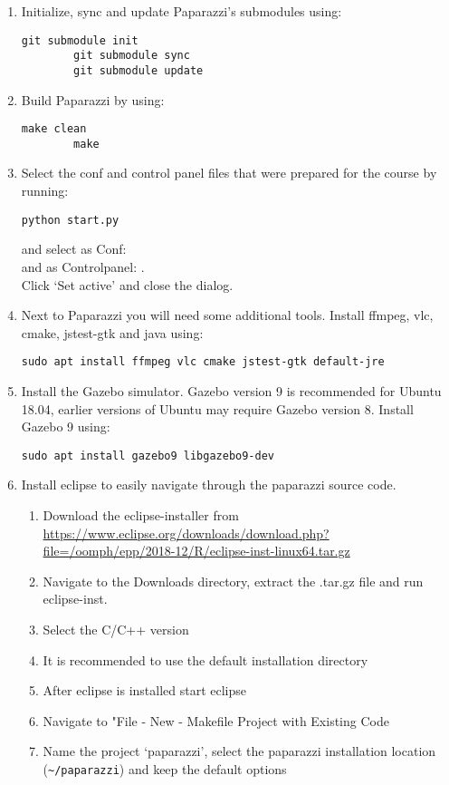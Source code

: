 \begin{enumerate}
	\item Initialize, sync and update Paparazzi's submodules using:
	\begin{lstlisting}[style=Bash]
		git submodule init
		git submodule sync
		git submodule update
	\end{lstlisting}
	
	\item Build Paparazzi by using:
	\begin{lstlisting}[style=Bash]
		make clean
		make
	\end{lstlisting}
	
	\item{Select the conf and control panel files that were prepared for the course by running:
	\begin{lstlisting}[style=Bash]
		python start.py
	\end{lstlisting}
	and select as Conf: \\
	and as Controlpanel: .\\
	Click `Set active' and close the dialog.}
	
	\item Next to Paparazzi you will need some additional tools. Install ffmpeg, vlc, cmake, jstest-gtk and java using:
	\begin{lstlisting}[style=Bash]
		sudo apt install ffmpeg vlc cmake jstest-gtk default-jre
	\end{lstlisting}
	\item Install the Gazebo simulator. Gazebo version 9 is recommended for Ubuntu 18.04, earlier versions of Ubuntu may require Gazebo version 8. Install Gazebo 9 using:
	\begin{lstlisting}[style=Bash]
		sudo apt install gazebo9 libgazebo9-dev
	\end{lstlisting}
	
	\item Install eclipse to easily navigate through the paparazzi source code.
		
	\begin{enumerate}
		\item{Download the eclipse-installer from \url{https://www.eclipse.org/downloads/download.php?file=/oomph/epp/2018-12/R/eclipse-inst-linux64.tar.gz}}
		\item{Navigate to the Downloads directory, extract the .tar.gz file and run eclipse-inst.}
		\item{Select the C/C++ version}
		\item{It is recommended to use the default installation directory}
		\item{After eclipse is installed start eclipse}
		\item{Navigate to "File - New - Makefile Project with Existing Code}
		\item{Name the project `paparazzi', select the paparazzi installation location (\verb|~/paparazzi|) and keep the default options}
	\end{enumerate}
	

\end{enumerate}
